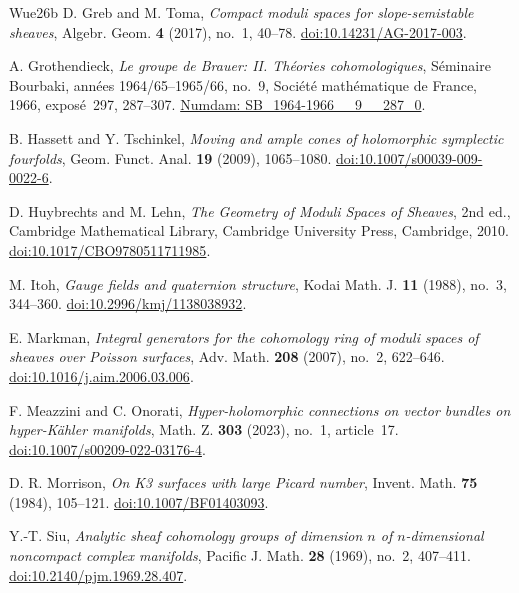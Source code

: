 \begin{thebibliography}{Wue26b}
D. Greb and M. Toma,
\emph{Compact moduli spaces for slope-semistable sheaves},
Algebr. Geom. \textbf{4} (2017), no.~1, 40--78.
\href{https://doi.org/10.14231/AG-2017-003}{doi:10.14231/AG-2017-003}.

A. Grothendieck,
\emph{Le groupe de Brauer: II. Th\'eories cohomologiques},
S\'eminaire Bourbaki, ann\'ees 1964/65--1965/66, no.~9,
Soci\'et\'e math\'ematique de France, 1966, expos\'e~297, 287--307.
\href{https://numdam.org/item/SB_1964-1966__9__287_0/}{Numdam: SB\_1964-1966\_\_9\_\_287\_0}.

B. Hassett and Y. Tschinkel,
\emph{Moving and ample cones of holomorphic symplectic fourfolds},
Geom. Funct. Anal. \textbf{19} (2009), 1065--1080.
\href{https://doi.org/10.1007/s00039-009-0022-6}{doi:10.1007/s00039-009-0022-6}.

D. Huybrechts and M. Lehn,
\emph{The Geometry of Moduli Spaces of Sheaves}, 2nd ed.,
Cambridge Mathematical Library, Cambridge University Press,
Cambridge, 2010.
\href{https://doi.org/10.1017/CBO9780511711985}{doi:10.1017/CBO9780511711985}.

M. Itoh,
\emph{Gauge fields and quaternion structure},
Kodai Math. J. \textbf{11} (1988), no.~3, 344--360.
\href{https://doi.org/10.2996/kmj/1138038932}{doi:10.2996/kmj/1138038932}.

E. Markman,
\emph{Integral generators for the cohomology ring of moduli spaces
of sheaves over Poisson surfaces}, Adv. Math. \textbf{208} (2007),
no.~2, 622--646.
\href{https://doi.org/10.1016/j.aim.2006.03.006}{doi:10.1016/j.aim.2006.03.006}.

F. Meazzini and C. Onorati,
\emph{Hyper-holomorphic connections on vector bundles on hyper-K\"ahler
manifolds}, Math. Z. \textbf{303} (2023), no.~1, article~17.
\href{https://doi.org/10.1007/s00209-022-03176-4}{doi:10.1007/s00209-022-03176-4}.

D. R. Morrison,
\emph{On K3 surfaces with large Picard number},
Invent. Math. \textbf{75} (1984), 105--121.
\href{https://doi.org/10.1007/BF01403093}{doi:10.1007/BF01403093}.

Y.-T. Siu,
\emph{Analytic sheaf cohomology groups of dimension $n$ of
$n$-dimensional noncompact complex manifolds},
Pacific J. Math. \textbf{28} (1969), no.~2, 407--411.
\href{https://doi.org/10.2140/pjm.1969.28.407}{doi:10.2140/pjm.1969.28.407}.


\end{thebibliography}
